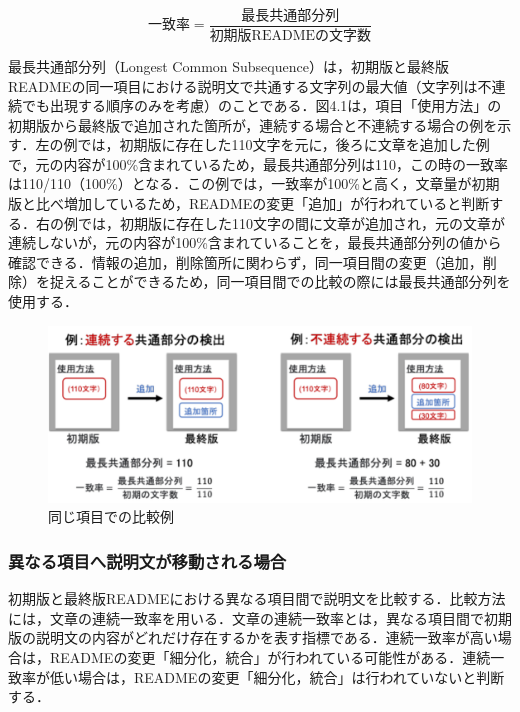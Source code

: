 \documentclass[submit]{ipsj}
\begin{document}
%

\begin{equation}
\label{calculate_rate}
\mbox{一致率} = \frac {\mbox{最長共通部分列}} {\mbox{初期版READMEの文字数}}
\end{equation}
\vspace{5pt}



最長共通部分列（Longest Common Subsequence）は，初期版と最終版READMEの同一項目における説明文で共通する文字列の最大値（文字列は不連続でも出現する順序のみを考慮）のことである．図4.1は，項目「使用方法」の初期版から最終版で追加された箇所が，連続する場合と不連続する場合の例を示す．左の例では，初期版に存在した110文字を元に，後ろに文章を追加した例で，元の内容が100\%含まれているため，最長共通部分列は110，この時の一致率は110/110（100\%）となる．この例では，一致率が100\%と高く，文章量が初期版と比べ増加しているため，READMEの変更「追加」が行われていると判断する．右の例では，初期版に存在した110文字の間に文章が追加され，元の文章が連続しないが，元の内容が100\%含まれていることを，最長共通部分列の値から確認できる．情報の追加，削除箇所に関わらず，同一項目間の変更（追加，削除）を捉えることができるため，同一項目間での比較の際には最長共通部分列を使用する．


\begin{figure}[t]
 	\centering
		\includegraphics[width=1.0\linewidth]{./IPSJ202303_Ishioka/LCS_add.pdf}
	\caption{同じ項目での比較例}
	\label{fig:oss_developments_eq}
\end{figure}






\subsubsection{異なる項目へ説明文が移動される場合}
初期版と最終版READMEにおける異なる項目間で説明文を比較する．比較方法には，文章の連続一致率を用いる．文章の連続一致率とは，異なる項目間で初期版の説明文の内容がどれだけ存在するかを表す指標である．連続一致率が高い場合は，READMEの変更「細分化，統合」が行われている可能性がある．連続一致率が低い場合は，READMEの変更「細分化，統合」は行われていないと判断する．
\end{document}
